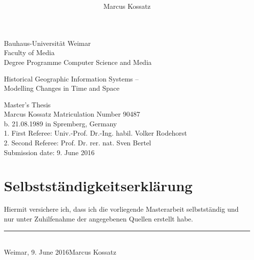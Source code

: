 \documentclass[11pt, a4paper]{report}
\title{\titleFirst \\ \titleSecond}
\author{Marcus Kossatz}
\date{\submissionDate}
\newcommand{\submissionDate}{9. June 2016}
\newcommand{\titleFirst}{Historical Geographic Information Systems --}
\newcommand{\titleSecond}{Modelling Changes in Time and Space}
\begin{document}

\begin{titlepage}

Bauhaus-Universität Weimar \\
Faculty of Media \\
Degree Programme Computer Science and Media \\ [2.0cm]

\begin{center}

{\huge \titleFirst} \\[0.5cm]
{\huge \titleSecond} \\[3.5cm]
\end{center}

{\LARGE Master's Thesis} \\[1.0cm]

Marcus Kossatz \hfill Matriculation Number 90487 \\
b. 21.08.1989 in Spremberg, Germany \\

1. First Referee: Univ.-Prof. Dr.-Ing. habil. Volker Rodehorst \\
2. Second Referee: Prof. Dr. rer. nat. Sven Bertel \\

\vfill
Submission date: \submissionDate

\end{titlepage}



\tableofcontents

\listoffigures
\listoftables



\newpage

\section*{Selbstständigkeitserklärung}

\vspace{10px}

Hiermit versichere ich, dass ich die vorliegende Masterarbeit selbstständig und nur unter Zuhilfenahme der angegebenen Quellen erstellt habe.

\vspace{20px}

\hfill \rule{120px}{0.5px} \\
Weimar, \submissionDate \hfill Marcus Kossatz

\newpage
















{}





\end{document}

